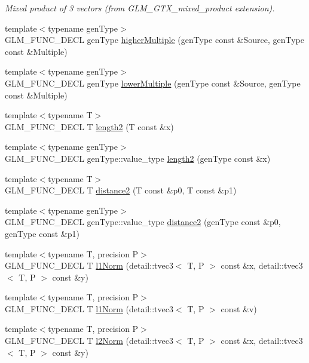 \begin{CompactItemize}
\begin{CompactList}\small\item\em Mixed product of 3 vectors (from GLM\_\-GTX\_\-mixed\_\-product extension). \item\end{CompactList}\item 
{\footnotesize template$<$typename genType$>$ }\\GLM\_\-FUNC\_\-DECL genType \hyperlink{group__gtx__multiple_gbd0db4e77a64ac833046cbbeb6fc5bf3}{higherMultiple} (genType const \&Source, genType const \&Multiple)
\item 
{\footnotesize template$<$typename genType$>$ }\\GLM\_\-FUNC\_\-DECL genType \hyperlink{group__gtx__multiple_gecccd82257351764e3c2bec8973458e3}{lowerMultiple} (genType const \&Source, genType const \&Multiple)
\item 
{\footnotesize template$<$typename T$>$ }\\GLM\_\-FUNC\_\-DECL T \hyperlink{group__gtx__norm_g6f970aba05e1299ed89d2ec3a410b7a9}{length2} (T const \&x)
\item 
{\footnotesize template$<$typename genType$>$ }\\GLM\_\-FUNC\_\-DECL genType::value\_\-type \hyperlink{group__gtx__norm_g2dfcdff0cc9119aa37c501d2c7a45020}{length2} (genType const \&x)
\item 
{\footnotesize template$<$typename T$>$ }\\GLM\_\-FUNC\_\-DECL T \hyperlink{group__gtx__norm_gaf6befa643aa9616f3c19e5548b11b54}{distance2} (T const \&p0, T const \&p1)
\item 
{\footnotesize template$<$typename genType$>$ }\\GLM\_\-FUNC\_\-DECL genType::value\_\-type \hyperlink{group__gtx__norm_g205e08f24b9e35f9f892b563f2b8dd94}{distance2} (genType const \&p0, genType const \&p1)
\item 
{\footnotesize template$<$typename T, precision P$>$ }\\GLM\_\-FUNC\_\-DECL T \hyperlink{group__gtx__norm_gf20fc187dfe66a474ecdba26e32ce4c6}{l1Norm} (detail::tvec3$<$ T, P $>$ const \&x, detail::tvec3$<$ T, P $>$ const \&y)
\item 
{\footnotesize template$<$typename T, precision P$>$ }\\GLM\_\-FUNC\_\-DECL T \hyperlink{group__gtx__norm_g5a6d616a6e0340b9329d5018f04c1aca}{l1Norm} (detail::tvec3$<$ T, P $>$ const \&v)
\item 
{\footnotesize template$<$typename T, precision P$>$ }\\GLM\_\-FUNC\_\-DECL T \hyperlink{group__gtx__norm_g2c87568b2888f01baf0133320c09b8ca}{l2Norm} (detail::tvec3$<$ T, P $>$ const \&x, detail::tvec3$<$ T, P $>$ const \&y)

\end{CompactItemize}
